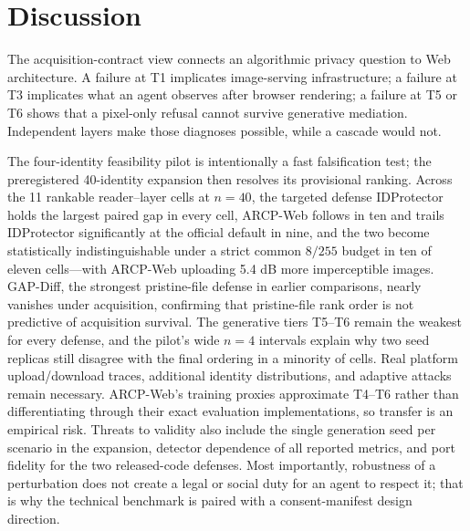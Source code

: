 \section{Discussion}
\label{sec:discussion}

The acquisition-contract view connects an algorithmic privacy question to Web
architecture. A failure at T1 implicates image-serving infrastructure; a failure
at T3 implicates what an agent observes after browser rendering; a failure at
T5 or T6 shows that a pixel-only refusal cannot survive generative mediation.
Independent layers make those diagnoses possible, while a cascade would not.

The four-identity feasibility pilot is intentionally a fast falsification test;
the preregistered 40-identity expansion then resolves its provisional ranking.
Across the 11 rankable reader--layer cells at $n=40$, the targeted defense
IDProtector holds the largest paired gap in every cell, ARCP-Web follows in ten
and trails IDProtector significantly at the official default in nine, and the
two become statistically indistinguishable under a strict common $8/255$ budget
in ten of eleven cells---with ARCP-Web uploading 5.4 dB more imperceptible
images. GAP-Diff, the strongest pristine-file defense in earlier comparisons,
nearly vanishes under acquisition, confirming that pristine-file rank order is
not predictive of acquisition survival. The generative tiers T5--T6 remain the
weakest for every defense, and the pilot's wide $n=4$ intervals explain why
two seed replicas still disagree with the final ordering in a minority of
cells.
Real platform upload/download traces, additional identity distributions, and
adaptive attacks remain necessary. ARCP-Web's training proxies approximate T4--T6
rather than differentiating through their exact evaluation implementations, so
transfer is an empirical risk. Threats to validity also include the single
generation seed per scenario in the expansion, detector dependence of all
reported metrics, and port fidelity for the two released-code defenses. Most
importantly, robustness of a perturbation does not create a legal or social
duty for an agent to respect it; that is why the technical benchmark is paired
with a consent-manifest design direction.
